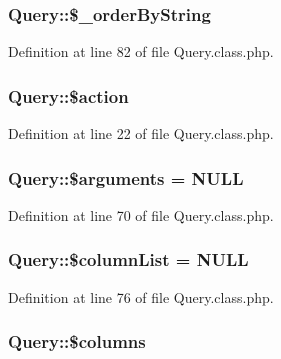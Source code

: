 \subsubsection[{\texorpdfstring{\$\+\_\+order\+By\+String}{$_orderByString}}]{\setlength{\rightskip}{0pt plus 5cm}Query\+::\$\+\_\+order\+By\+String}\hypertarget{classQuery_aaf035e5cfac7afe46163a6ba4c55c34b}{}\label{classQuery_aaf035e5cfac7afe46163a6ba4c55c34b}


Definition at line 82 of file Query.\+class.\+php.

\subsubsection[{\texorpdfstring{\$action}{$action}}]{\setlength{\rightskip}{0pt plus 5cm}Query\+::\$action}\hypertarget{classQuery_a62c36010085369fc0508ea548660be9f}{}\label{classQuery_a62c36010085369fc0508ea548660be9f}


Definition at line 22 of file Query.\+class.\+php.

\subsubsection[{\texorpdfstring{\$arguments}{$arguments}}]{\setlength{\rightskip}{0pt plus 5cm}Query\+::\$arguments = N\+U\+LL}\hypertarget{classQuery_a49166e3c5f5198e4b899c8ee47b6258a}{}\label{classQuery_a49166e3c5f5198e4b899c8ee47b6258a}


Definition at line 70 of file Query.\+class.\+php.

\subsubsection[{\texorpdfstring{\$column\+List}{$columnList}}]{\setlength{\rightskip}{0pt plus 5cm}Query\+::\$column\+List = N\+U\+LL}\hypertarget{classQuery_a113bcdfdc3bf6acef684a06ae324334a}{}\label{classQuery_a113bcdfdc3bf6acef684a06ae324334a}


Definition at line 76 of file Query.\+class.\+php.

\subsubsection[{\texorpdfstring{\$columns}{$columns}}]{\setlength{\rightskip}{0pt plus 5cm}Query\+::\$columns}\hypertarget{classQuery_a7cf97254cbd55fdbb9e149723498d9ba}{}\label{classQuery_a7cf97254cbd55fdbb9e149723498d9ba}


